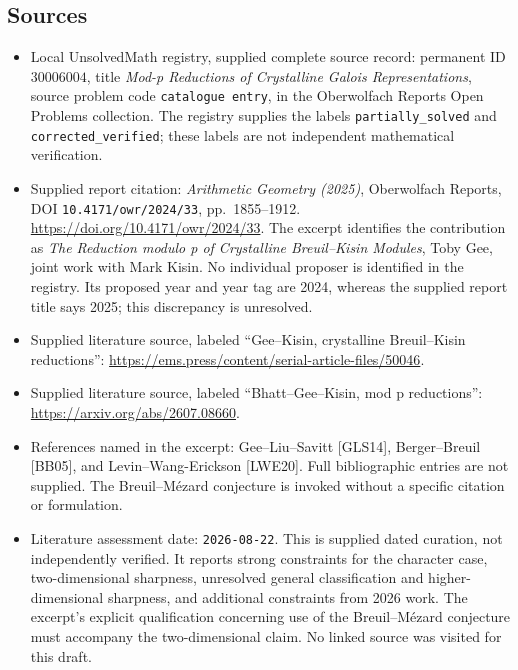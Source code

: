 \documentclass[11pt]{article}
\begin{document}
\subsection{Sources}
\begin{itemize}
\item Local UnsolvedMath registry, supplied complete source record: permanent ID \(30006004\), title \emph{Mod-p Reductions of Crystalline Galois Representations}, source problem code \texttt{catalogue entry}, in the Oberwolfach Reports Open Problems collection. The registry supplies the labels \texttt{partially\_solved} and \texttt{corrected\_verified}; these labels are not independent mathematical verification.
\item Supplied report citation: \emph{Arithmetic Geometry (2025)}, Oberwolfach Reports, DOI \texttt{10.4171/owr/2024/33}, pp.\ 1855--1912. \url{https://doi.org/10.4171/owr/2024/33}. The excerpt identifies the contribution as \emph{The Reduction modulo p of Crystalline Breuil--Kisin Modules}, Toby Gee, joint work with Mark Kisin. No individual proposer is identified in the registry. Its proposed year and year tag are 2024, whereas the supplied report title says 2025; this discrepancy is unresolved.
\item Supplied literature source, labeled ``Gee--Kisin, crystalline Breuil--Kisin reductions'': \url{https://ems.press/content/serial-article-files/50046}.
\item Supplied literature source, labeled ``Bhatt--Gee--Kisin, mod p reductions'': \url{https://arxiv.org/abs/2607.08660}.
\item References named in the excerpt: Gee--Liu--Savitt [GLS14], Berger--Breuil [BB05], and Levin--Wang-Erickson [LWE20]. Full bibliographic entries are not supplied. The Breuil--M\'ezard conjecture is invoked without a specific citation or formulation.
\item Literature assessment date: \texttt{2026-08-22}. This is supplied dated curation, not independently verified. It reports strong constraints for the character case, two-dimensional sharpness, unresolved general classification and higher-dimensional sharpness, and additional constraints from 2026 work. The excerpt's explicit qualification concerning use of the Breuil--M\'ezard conjecture must accompany the two-dimensional claim. No linked source was visited for this draft.
\end{itemize}
\end{document}
